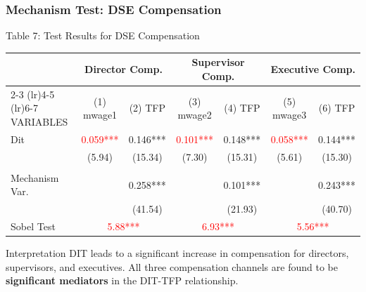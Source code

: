 \documentclass[aspectratio=169]{beamer}
\begin{document}
\begin{frame}[fragile]
    \frametitle{Mechanism Test: DSE Compensation}
    \begin{block}{Table 7: Test Results for DSE Compensation}
    \centering
    \tiny
    \begin{tabular}{l c c c c c c}
    \toprule
    & \multicolumn{2}{c}{Director Comp.} & \multicolumn{2}{c}{Supervisor Comp.} & \multicolumn{2}{c}{Executive Comp.} \\
    \cmidrule(lr){2-3} \cmidrule(lr){4-5} \cmidrule(lr){6-7}
    VARIABLES & (1) mwage1 & (2) TFP & (3) mwage2 & (4) TFP & (5) mwage3 & (6) TFP \\
    \midrule
    Dit & \textcolor{red}{0.059***}& 0.146*** & \textcolor{red}{0.101***} & 0.148*** & \textcolor{red}{0.058***} & 0.144*** \\
        & (5.94) & (15.34)  & (7.30)   & (15.31)  & (5.61)   & (15.30) \\
    \\
    Mechanism Var. & & 0.258*** & & 0.101*** & & 0.243*** \\
                   & & (41.54)  & & (21.93)  & & (40.70) \\
    \midrule
    Sobel Test & \multicolumn{2}{c}{\textcolor{red}{5.88***}} & \multicolumn{2}{c}{\textcolor{red}{6.93***}} & \multicolumn{2}{c}{\textcolor{red}{5.56***}} \\
    \bottomrule
    \end{tabular}
    \end{block}
    \vfill
    \begin{alertblock}{Interpretation}
        DIT leads to a significant increase in compensation for directors, supervisors, and executives. All three compensation channels are found to be \textbf{significant mediators} in the DIT-TFP relationship.
    \end{alertblock}
\end{frame}
\end{document}
